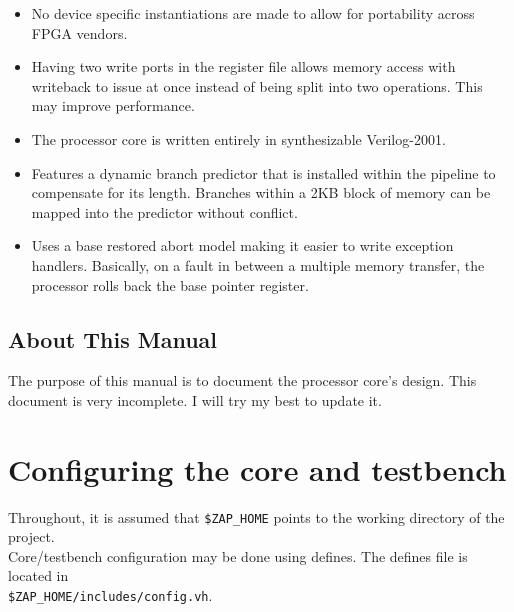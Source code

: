 \documentclass[11pt]{article}
\begin{document}
\begin{itemize}
\item No device specific instantiations are made to allow for portability
across FPGA vendors.

\item Having two write ports in the register file allows memory access with
writeback to issue at once instead of being split into two operations. This
may improve performance.

\item The processor core is written entirely in synthesizable Verilog-2001.

\item Features a dynamic branch predictor that is installed within the
pipeline to compensate for its length. Branches within a 2KB block of memory 
can be mapped into the predictor without conflict.

\item Uses a base restored abort model making it easier to write exception
handlers. Basically, on a fault in between a multiple memory transfer, the
processor rolls back the base pointer register.

\end{itemize}


\subsection{About This Manual}
The purpose of this manual is to document the processor core's design. This
document is very incomplete. I will try my best to update it.

\pagebreak
\section{Configuring the core and testbench}
Throughout, it is assumed that \texttt{\$ZAP\_HOME} points to the working
directory of the project.\\
Core/testbench configuration may be done using defines. The defines file is 
located in \\
\texttt{\$ZAP\_HOME/includes/config.vh}. \\
\end{document}
